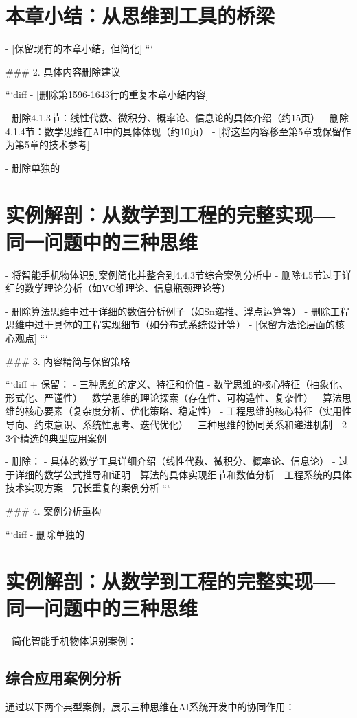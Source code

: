 \section{本章小结：从思维到工具的桥梁} %
- [保留现有的本章小结，但简化]
```

### 2. 具体内容删除建议

```diff
- [删除第1596-1643行的重复本章小结内容]

- 删除4.1.3节：线性代数、微积分、概率论、信息论的具体介绍（约15页）
- 删除4.1.4节：数学思维在AI中的具体体现（约10页）
- [将这些内容移至第5章或保留作为第5章的技术参考]

- 删除单独的\section{实例解剖：从数学到工程的完整实现---同一问题中的三种思维}
- 将智能手机物体识别案例简化并整合到4.4.3节综合案例分析中
- 删除4.5节过于详细的数学理论分析（如VC维理论、信息瓶颈理论等）

- 删除算法思维中过于详细的数值分析例子（如Sn递推、浮点运算等）
- 删除工程思维中过于具体的工程实现细节（如分布式系统设计等）
- [保留方法论层面的核心观点]
```

### 3. 内容精简与保留策略

```diff
+ 保留：
  - 三种思维的定义、特征和价值
  - 数学思维的核心特征（抽象化、形式化、严谨性）
  - 数学思维的理论探索（存在性、可构造性、复杂性）
  - 算法思维的核心要素（复杂度分析、优化策略、稳定性）
  - 工程思维的核心特征（实用性导向、约束意识、系统性思考、迭代优化）
  - 三种思维的协同关系和递进机制
  - 2-3个精选的典型应用案例

- 删除：
  - 具体的数学工具详细介绍（线性代数、微积分、概率论、信息论）
  - 过于详细的数学公式推导和证明
  - 算法的具体实现细节和数值分析
  - 工程系统的具体技术实现方案
  - 冗长重复的案例分析
```

### 4. 案例分析重构

```diff
- 删除单独的\section{实例解剖：从数学到工程的完整实现---同一问题中的三种思维}
- 简化智能手机物体识别案例：

\subsection{综合应用案例分析}
通过以下两个典型案例，展示三种思维在AI系统开发中的协同作用：

